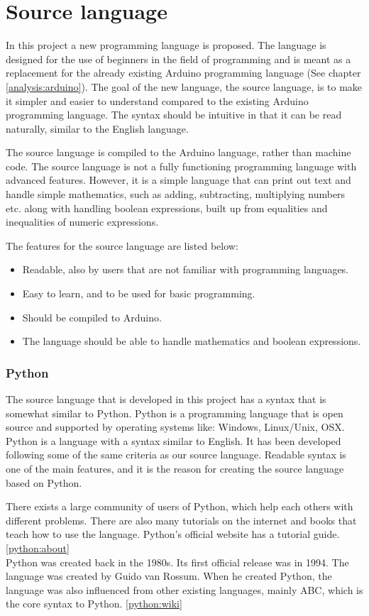 \chapter{Source language}\label{analysis:source-language}
In this project a new programming language is proposed. The language is designed for the use of beginners in the field of programming and is meant as a replacement for the already existing Arduino programming language (See chapter \ref{analysis:arduino}).
The goal of the new language, the source language, is to make it simpler and easier to understand compared to the existing Arduino programming language. The syntax should be intuitive in that it can be read naturally, similar to the English language.

The source language is compiled to the Arduino language, rather than machine code. The source language is not a fully functioning programming language with advanced features. However, it is a simple language that can print out text and handle simple mathematics, such as adding, subtracting, multiplying numbers etc. along with handling boolean expressions, built up from equalities and inequalities of numeric expressions.

The features for the source language are listed below:
\begin{itemize}
	\item Readable, also by users that are not familiar with programming languages.
	\item Easy to learn, and to be used for basic programming.
	\item Should be compiled to Arduino.
	\item The language should be able to handle mathematics and boolean expressions.
\end{itemize}

\subsection{Python}
The source language that is developed in this project has a syntax that is somewhat similar to Python. Python is a programming language that is open source and supported by operating systems like: Windows, Linux/Unix, OSX. Python is a language with a syntax similar to English. It has been developed following some of the same criteria as our source language. Readable syntax is one of the main features, and it is the reason for creating the source language based on Python.
 
\cite{python:official:about}
There exists a large community of users of Python, which help each others with different problems. There are also many tutorials on the internet and books that teach how to use the language. Python's official website has a tutorial guide.\ref{python:about} \\
Python was created back in the 1980s. Its first official release was in 1994. The language was created by Guido van Rossum. When he created Python, the language was also influenced from other existing languages, mainly ABC, which is the core syntax to Python. \ref{python:wiki}